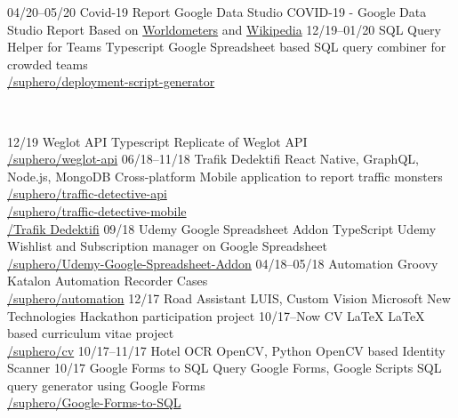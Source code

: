 \documentclass[]{../friggeri-cv} %
\begin{document}
\begin{entrylist}

\entry
{04/20--05/20}
{Covid-19 Report}
{Google Data Studio}
{COVID-19 - Google Data Studio Report Based on  \href{https://www.worldometers.info/coronavirus}{Worldometers} and \href{https://en.wikipedia.org/wiki/COVID-19_pandemic}{Wikipedia}}
\entry
{12/19--01/20}
{SQL Query Helper for Teams}
{Typescript}
{Google Spreadsheet based SQL query combiner for crowded teams
\\\href{https://github.com/suphero/deployment-script-generator}{\faGithub/suphero/deployment-script-generator}}
\end{entrylist}
\\
\begin{entrylist}
\entry
{12/19}
{Weglot API}
{Typescript}
{Replicate of Weglot API
\\\href{https://github.com/suphero/weglot-api}{\faGithub/suphero/weglot-api}}
\entry
{06/18--11/18}
{Trafik Dedektifi}
{React Native, GraphQL, Node.js, MongoDB}
{Cross-platform Mobile application to report traffic monsters
\\\href{https://github.com/suphero/traffic-detective-api}{\faGithub/suphero/traffic-detective-api}
\\\href{https://github.com/suphero/traffic-detective-mobile}{\faGithub/suphero/traffic-detective-mobile}
\\\href{https://play.google.com/store/apps/details?id=com.harunsokullu.trafficdetective}{\faAndroid/Trafik Dedektifi}}
\entry
{09/18}
{Udemy Google Spreadsheet Addon}
{TypeScript}
{Udemy Wishlist and Subscription manager on Google Spreadsheet
\\\href{https://github.com/suphero/Udemy-Google-Spreadsheet-Addon}{\faGithub/suphero/Udemy-Google-Spreadsheet-Addon}}
\entry
{04/18--05/18}
{Automation}
{Groovy}
{Katalon Automation Recorder Cases
\\\href{https://github.com/suphero/automation}{\faGithub/suphero/automation}}
\entry
{12/17}
{Road Assistant}
{LUIS, Custom Vision}
{Microsoft New Technologies Hackathon participation project}
\entry
{10/17--Now}
{CV}
{\LaTeX}
{LaTeX based curriculum vitae project
\\\href{https://github.com/suphero/cv}{\faGithub/suphero/cv}}
\entry
{10/17--11/17}
{Hotel OCR}
{OpenCV, Python}
{OpenCV based Identity Scanner}
\entry
{10/17}
{Google Forms to SQL Query}
{Google Forms, Google Scripts}
{SQL query generator using Google Forms
\\\href{https://github.com/suphero/Google-Forms-to-SQL}{\faGithub/suphero/Google-Forms-to-SQL}}

\end{entrylist}
\end{document}
